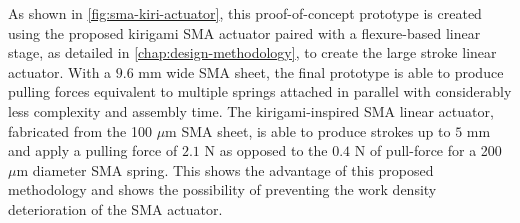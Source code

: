 As shown in \cref{fig:sma-kiri-actuator}, this proof-of-concept prototype is created using the proposed kirigami SMA actuator paired with a flexure-based linear stage, as detailed in \cref{chap:design-methodology}, to create the large stroke linear actuator. With a $9.6$ mm wide SMA sheet, the final prototype is able to produce pulling forces equivalent to multiple springs attached in parallel with considerably less complexity and assembly time. The kirigami-inspired SMA linear actuator, fabricated from the 100 $\mu$m SMA sheet, is able to produce strokes up to $5$ mm and apply a pulling force of $2.1$ N as opposed to the $0.4$ N of pull-force for a 200 $\mu$m diameter SMA spring. This shows the advantage of this proposed methodology and shows the possibility of preventing the work density deterioration of the SMA actuator.
